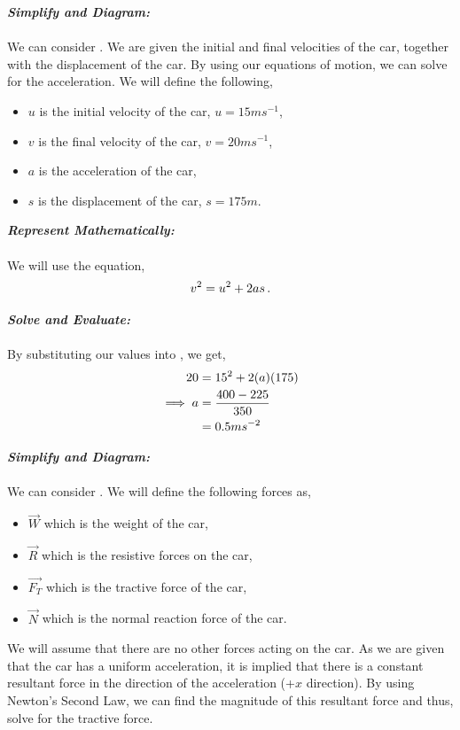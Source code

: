\begin{subquestions}
\begin{subsubquestions}
\subsubquestion

\textbf{\textit{Simplify and Diagram:}} \\ \\
We can consider . We are given the initial and final velocities of the car, together with the displacement of the car. By using our equations of motion, we can solve for the acceleration.
We will define the following,
\begin{itemize}
	\item $u$ is the initial velocity of the car, $u=15ms^{-1}$,
	\item $v$ is the final velocity of the car, $v=20ms^{-1}$,
	\item $a$ is the acceleration of the car,
	\item $s$ is the displacement of the car, $s=175m$.
\end{itemize}




\textbf{\textit{Represent Mathematically:}} \\ \\
We will use the equation,
\begin{equation}
	v^2 = u^2 + 2as \,. \label{2011:q5:AEqn1} \\	
\end{equation}




\textbf{\textit{Solve and Evaluate:}} \\ \\
By substituting our values into , we get,
\begin{align}
	20 & = 15^2 + 2(a)(175) \nonumber \\
	\implies a & = \frac{400-225}{350} \nonumber \\
	  & = 0.5ms^{-2} 
\end{align}


\subsubquestion

\textbf{\textit{Simplify and Diagram:}} \\ \\
We can consider . We will define the following forces as,
\begin{itemize}
	\item $\vec{W}$ which is the weight of the car,
	\item $\vec{R}$ which is the resistive forces on the car,
	\item $\vec{F_T}$ which is the tractive force of the car,
	\item $\vec{N}$ which is the normal reaction force of the car.
\end{itemize}
We will assume that there are no other forces acting on the car. As we are given that the car has a uniform acceleration, it is implied that there is a constant resultant force in the direction of the acceleration (+$x$ direction). By using Newton's Second Law, we can find the magnitude of this resultant force and thus, solve for the tractive force.




\end{subsubquestions}
\end{subquestions}
